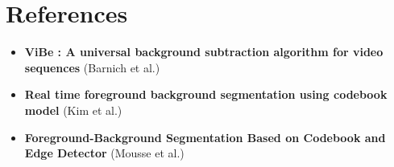 \documentclass[12pt,a4paper]{article}
\begin{document}
\section{References}
\begin{itemize}
\item \textbf{ViBe : A universal background subtraction algorithm for video sequences} (Barnich et al.)
\item \textbf{Real time foreground background segmentation using codebook model} (Kim et al.)
\item \textbf{Foreground-Background Segmentation Based on Codebook and Edge Detector} (Mousse et al.)
\end{itemize}
\end{document}
